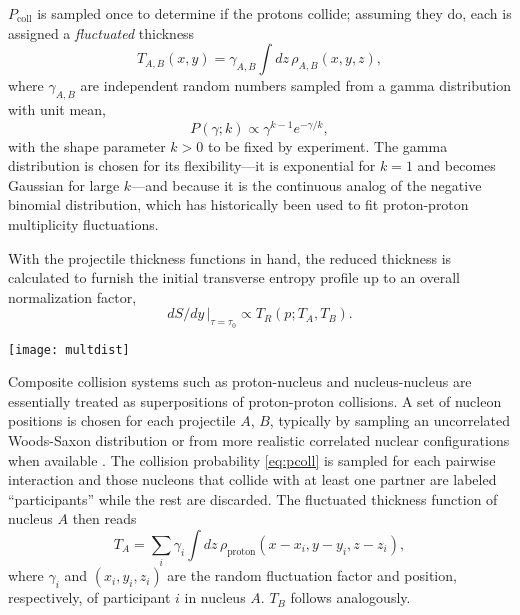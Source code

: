 \documentclass[aps,prc,reprint,amsmath,nofootinbib]{revtex4-1}
\newcommand{\trento}{T\raisebox{-.5ex}{R}ENTo}
\begin{document}
$P_\text{coll}$ is sampled once to determine if the protons collide; assuming they do, each is assigned a \emph{fluctuated} thickness
\begin{equation}
  T_{A,B}(x, y) = \gamma_{A,B} \int dz \, \rho_{A,B}(x, y, z),
\end{equation}
where $\gamma_{A,B}$ are independent random numbers sampled from a gamma distribution with unit mean,
\begin{equation}
  P(\gamma; k) \propto \gamma^{k-1} e^{-\gamma/k},
  \label{eq:gamma}
\end{equation}
with the shape parameter $k > 0$ to be fixed by experiment.  The gamma distribution is chosen for its
flexibility---it is exponential for $k = 1$ and becomes Gaussian for large $k$---and because it is the
continuous analog of the negative binomial distribution, which has historically been used to fit proton-proton
multiplicity fluctuations.

With the projectile thickness functions in hand, the reduced thickness is calculated to furnish the initial transverse entropy profile up to an overall normalization factor,
\begin{equation}
dS/dy \, |_{\tau = \tau_0} \propto T_R(p; T_A, T_B).
\end{equation}

\begin{figure*}[t]
  \texttt{[image: multdist]}
  \caption{
    \label{fig:multdist}
    Multiplicity distributions for proton-proton, proton-lead, and lead-lead collisions.  The blue histograms
    are \protect\trento\ results from $10^6$ minimum-bias events for each collision system, all with reduced
    thickness parameter $p = 0$ (geometric mean) and gamma fluctuation parameter $k = 1.25$.  The normalization
    constants indicated in the legends are tuned to match the experimental distributions
    (points with error bars) from ALICE \cite{Aamodt:2010ft,Abelev:2014mda}.
  }
\end{figure*}

Composite collision systems such as proton-nucleus and nucleus-nucleus are essentially treated as
superpositions of proton-proton collisions.
A set of nucleon positions is chosen for each projectile $A$, $B$, typically by sampling an uncorrelated Woods-Saxon distribution or from more realistic correlated nuclear configurations when available \cite{Alvioli:2009ab}.
The collision probability \eqref{eq:pcoll} is sampled for each pairwise interaction and those nucleons that collide with at least one partner are labeled ``participants'' while the rest are discarded.
The fluctuated thickness function of nucleus $A$ then reads
\begin{equation}
  T_A = \sum_i \gamma_i \int dz \, \rho_\text{proton}(x - x_i, y - y_i, z - z_i),
  \label{eq:nuc-thickness}
\end{equation}
where $\gamma_i$ and $(x_i, y_i, z_i)$ are the random fluctuation factor and position, respectively, of participant $i$ in nucleus $A$.
$T_B$ follows analogously.
\end{document}
